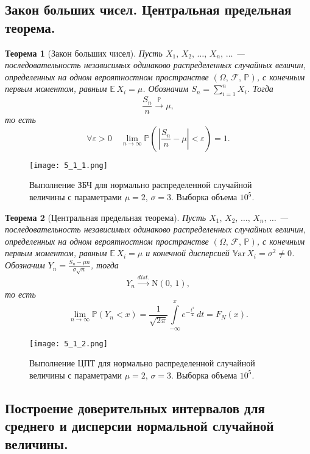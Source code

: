 \documentclass[a4paper, 11pt]{article}
\theoremstyle{def}
\theoremstyle{th}
\newtheorem{theorem}{Теорема}[section]
\theoremstyle{rem}
\newcommand{\p}{\mathbb{P}}
\newcommand{\E}{\mathbb{E}}
\newcommand{\Var}{\mathbb{V}\mbox{ar}}
\begin{document}
\subsection{Закон больших чисел. Центральная предельная теорема.}

\begin{theorem}[Закон больших чисел]
        Пусть $X_1,\,X_2,\,\ldots,\,X_n,\,\ldots$ ---  последовательность независимых одинаково распределенных случайных величин, определенных на одном вероятностном пространстве $(\Omega,\, \mathcal{F},\, \p)$, с конечным первым моментом, равным $\E\,X_i = \mu$. Обозначим $S_n = \sum_{i = 1}^{n} X_i$. Тогда
$$
        \frac{S_n}{n} \xrightarrow{\p} \mu,
$$
то есть
$$
        \forall \varepsilon > 0
        \quad
        \lim\limits_{n\to\infty}
        \p\left(\,
        \left|
                \frac{S_n}{n} - \mu
        \right|
        < \varepsilon
        \right)
        = 1.
$$
\end{theorem}
\begin{figure}[H]
        \noindent
        \centering
        {
                \texttt{[image: 5\_1\_1.png]}
        }
        \caption{Выполнение ЗБЧ для нормально распределенной случайной величины с параметрами $\mu = 2$, $\sigma = 3$. Выборка объема $10^5$.}
\end{figure}

\begin{theorem} [Центральная предельная теорема]
        Пусть $X_1,\,X_2,\,\ldots,\,X_n,\,\ldots$ ---  последовательность независимых одинаково распределенных случайных величин, определенных на одном вероятностном пространстве $(\Omega,\, \mathcal{F},\, \p)$, с конечным первым моментом, равным $\E\,X_i = \mu$ и конечной дисперсией $\Var\,X_i = \sigma^2 \neq 0$. Обозначим $\displaystyle Y_n = \frac{S_n - \mu n}{\sigma \sqrt{n}}$, тогда
$$
        Y_n \xrightarrow{dist.} \mbox{N}(0,\,1),
$$
то есть
$$
        \lim\limits_{n\to\infty}\p(Y_n < x) =
        \frac{1}{\sqrt{2\pi}}\int\limits_{-\infty}^{x} e^{-\frac{t^2}{2}}\,dt
        = F_N(x).
$$
\end{theorem}
\begin{figure}[H]
        \noindent
        \centering
        {
                \texttt{[image: 5\_1\_2.png]}
        }
        \caption{Выполнение ЦПТ для нормально распределенной случайной величины с параметрами $\mu = 2$, $\sigma = 3$. Выборка объема $10^5$.}
\end{figure}

\subsection{Построение доверительных интервалов для среднего и дисперсии нормальной случайной величины.}
\end{document}
